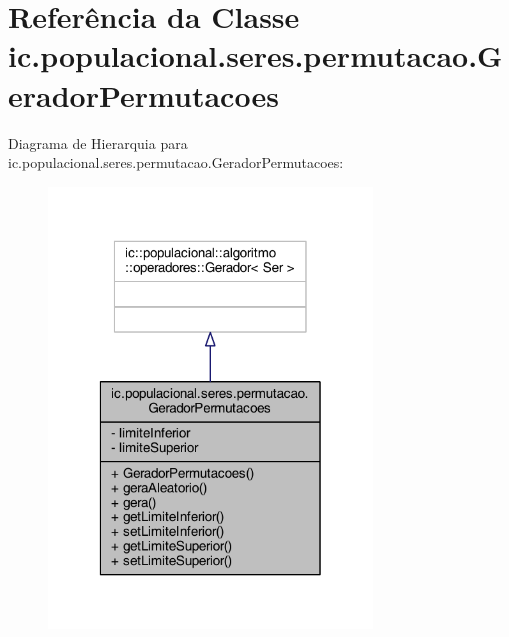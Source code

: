 \hypertarget{classic_1_1populacional_1_1seres_1_1permutacao_1_1_gerador_permutacoes}{\section{Referência da Classe ic.\-populacional.\-seres.\-permutacao.\-Gerador\-Permutacoes}
\label{classic_1_1populacional_1_1seres_1_1permutacao_1_1_gerador_permutacoes}
}


Diagrama de Hierarquia para ic.\-populacional.\-seres.\-permutacao.\-Gerador\-Permutacoes\-:\nopagebreak
\begin{figure}[H]
\begin{center}
\leavevmode
\includegraphics[width=244pt]{classic_1_1populacional_1_1seres_1_1permutacao_1_1_gerador_permutacoes__inherit__graph}
\end{center}
\end{figure}


